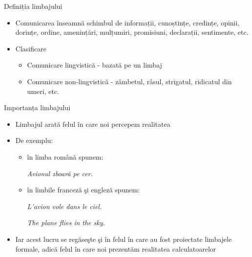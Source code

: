 \documentclass[pdf]{beamer}
\begin{document}
\begin{frame}{Definiția limbajului}
\begin{itemize}
\item
Comunicarea înseamnă schimbul de informații, cunoștințe, credințe, opinii, dorințe, ordine, amenințări, mulțumiri, promisiuni, declarații, sentimente, etc.
\item
Clasificare
\begin{itemize}
\item
Comunicare lingvistică - bazată pe un limbaj
\item
Comunicare non-lingvistică - zâmbetul, râsul, strigatul, ridicatul din umeri, etc.
\end{itemize}
\end{itemize}
\end{frame}



\begin{frame}{Importanța limbajului}
\begin{itemize}
\item
Limbajul arată felul în care noi percepem realitatea
\item
De exemplu: 
\begin{itemize}
\item
în limba română spunem: 

\textit{Avionul zboară pe cer.}

\item
în limbile franceză şi engleză spunem:

\textit{L’avion vole dans le ciel.}

\textit{The plane flies in the sky.}
\end{itemize}
\item
Iar acest lucru se regăseşte şi în felul în care au fost proiectate limbajele formale, adică felul în care noi prezentăm realitatea calculatoarelor
\end{itemize}
\end{frame}
\end{document}
